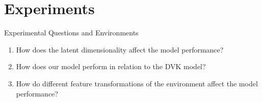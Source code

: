 \documentclass[
	aspectratio=43,
	color={accentcolor=1c},
	logo=false,
	colorframetitle=true,
	handout
]{tudabeamer}
\begin{document}
	\section{Experiments}
		\begin{frame}{Experimental Questions and Environments}
			\begin{enumerate}
				\item How does the latent dimensionality affect the model performance?
				\item How does our model perform in relation to the DVK model?
				\item How do different feature transformations of the environment affect the model performance?
			\end{enumerate}

		\end{frame}
\end{document}
